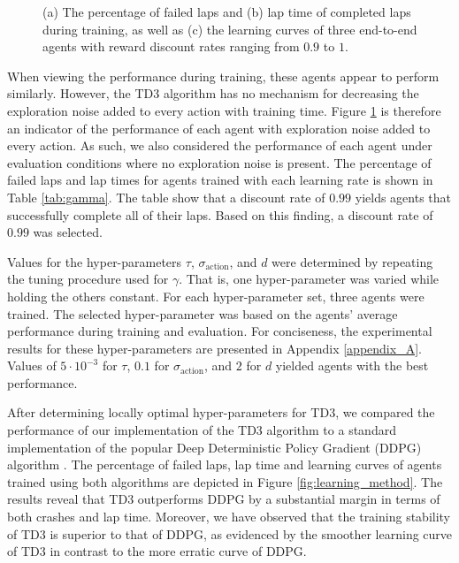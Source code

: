 \begin{figure}[htb!]
    \centering
    
    \caption[Learning curves for tuning reward discount rate]{(a) The percentage of failed laps and (b) lap time of completed laps during training, as well as (c) the learning curves of three end-to-end agents with reward discount rates ranging from $0.9$ to $1$.}
    \label{fig:gamma}
\end{figure}

When viewing the performance during training, these agents appear to perform similarly.
However, the TD3 algorithm has no mechanism for decreasing the exploration noise added to every action with training time.
Figure \ref{fig:gamma} is therefore an indicator of the performance of each agent with exploration noise added to every action.
As such, we also considered the performance of each agent under evaluation conditions where no exploration noise is present.
The percentage of failed laps and lap times for agents trained with each learning rate is shown in Table \ref{tab:gamma}.
The table show that a discount rate of $0.99$ yields agents that successfully complete all of their laps. 
Based on this finding, a discount rate of $0.99$ was selected.



Values for the hyper-parameters $\tau$, $\sigma_{\text{action}}$, and $d$ were determined by repeating the tuning procedure used for $\gamma$. 
That is, one hyper-parameter was varied while holding the others constant.
For each hyper-parameter set, three agents were trained.
The selected hyper-parameter was based on the agents' average performance during training and evaluation. 
For conciseness, the experimental results for these hyper-parameters are presented in Appendix \ref{appendix_A}. 
Values of $5\cdot10^{-3}$ for $\tau$, $0.1$ for $\sigma_{\text{action}}$, and $2$ for $d$ yielded agents with the best performance.


After determining locally optimal hyper-parameters for TD3, we compared the performance of our implementation of the TD3 algorithm to a standard implementation of the popular Deep Deterministic Policy Gradient (DDPG) algorithm  \cite{Ivanov2020, Capo2020, Niu2020}.
The percentage of failed laps, lap time and learning curves of agents trained using both algorithms are depicted in Figure \ref{fig:learning_method}.
The results reveal that TD3 outperforms DDPG by a substantial margin in terms of both crashes and lap time.
Moreover, we have observed that the training stability of TD3 is superior to that of DDPG, as evidenced by the smoother learning curve of TD3 in contrast to the more erratic curve of DDPG.


